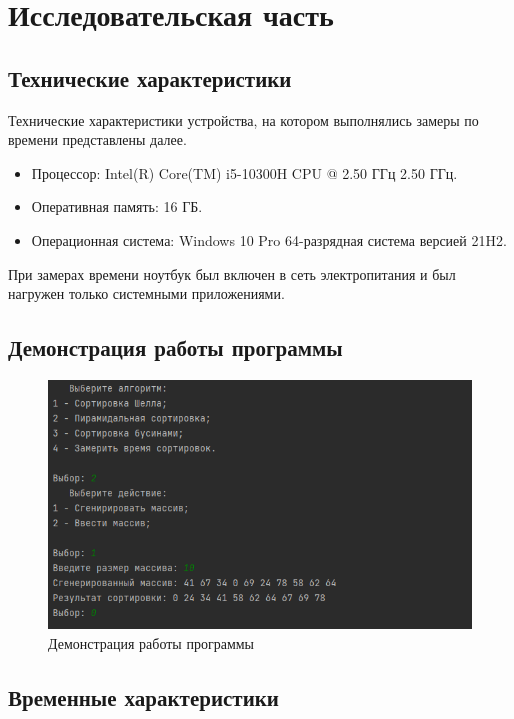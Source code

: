 \chapter{Исследовательская часть}

\section{Технические характеристики}

Технические характеристики устройства, на котором выполнялись замеры по времени представлены далее.

\begin{itemize}
	\item Процессор: Intel(R) Core(TM) i5-10300H CPU @ 2.50 ГГц 2.50 ГГц.
	\item Оперативная память: 16 ГБ.
	\item Операционная система: Windows 10 Pro 64-разрядная система версией 21H2.
\end{itemize}

При замерах времени ноутбук был включен в сеть электропитания и был нагружен только системными приложениями.

\section{Демонстрация работы программы}

\begin{figure}[h]
	\centering
	\includegraphics[height=0.4\textheight]{img/example.png}
	\caption{Демонстрация работы программы}
	\label{img:demonstration}
\end{figure}

\clearpage

\section{Временные характеристики}

